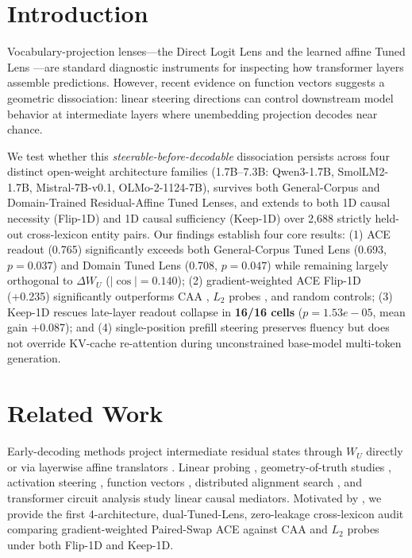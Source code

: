 \documentclass[10pt]{article}
\begin{document}
\section{Introduction}
Vocabulary-projection lenses---the Direct Logit Lens \citep{nostalgebraist2020logitlens} and the learned affine Tuned Lens \citep{belrose2023tunedlens}---are standard diagnostic instruments for inspecting how transformer layers assemble predictions. However, recent evidence on function vectors \citep{todd2024function,steerable2026} suggests a geometric dissociation: linear steering directions can control downstream model behavior at intermediate layers where unembedding projection decodes near chance.

We test whether this \emph{steerable-before-decodable} dissociation persists across four distinct open-weight architecture families (1.7B--7.3B: Qwen3-1.7B, SmolLM2-1.7B, Mistral-7B-v0.1, OLMo-2-1124-7B), survives both General-Corpus and Domain-Trained Residual-Affine Tuned Lenses, and extends to both 1D causal necessity (Flip-1D) and 1D causal sufficiency (Keep-1D) over 2,688 strictly held-out cross-lexicon entity pairs. Our findings establish four core results: (1) ACE readout (0.765) significantly exceeds both General-Corpus Tuned Lens (0.693, $p=0.037$) and Domain Tuned Lens (0.708, $p=0.047$) while remaining largely orthogonal to $\Delta W_U$ ($|\cos| = 0.140$); (2) gradient-weighted ACE Flip-1D (+0.235) significantly outperforms CAA \citep{panickssery2024caa}, $L_2$ probes \citep{alain2017probes}, and random controls; (3) Keep-1D rescues late-layer readout collapse in \textbf{16/16 cells} ($p=1.53e-05$, mean gain +0.087); and (4) single-position prefill steering preserves fluency but does not override KV-cache re-attention during unconstrained base-model multi-token generation.

\section{Related Work}
Early-decoding methods project intermediate residual states through $W_U$ directly \citep{nostalgebraist2020logitlens} or via layerwise affine translators \citep{belrose2023tunedlens}. Linear probing \citep{alain2017probes}, geometry-of-truth studies \citep{marks2024truth}, activation steering \citep{turner2023actadd,panickssery2024caa}, function vectors \citep{todd2024function}, distributed alignment search \citep{geiger2024das}, and transformer circuit analysis \citep{elhage2021circuits} study linear causal mediators. Motivated by \citet{steerable2026}, we provide the first 4-architecture, dual-Tuned-Lens, zero-leakage cross-lexicon audit comparing gradient-weighted Paired-Swap ACE against CAA and $L_2$ probes under both Flip-1D and Keep-1D.
\end{document}
